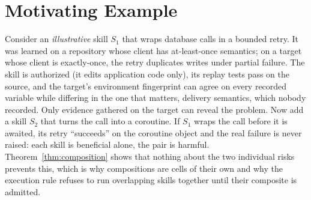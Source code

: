 \section{Motivating Example}
\label{sec:motivation}
Consider an \emph{illustrative} skill $S_1$ that wraps database calls in a bounded retry.  It was learned on a repository whose client
has at-least-once semantics; on a target whose client is exactly-once, the retry duplicates writes under partial failure.  The skill
is authorized (it edits application code only), its replay tests pass on the source, and the target's environment fingerprint can
agree on every recorded variable while differing in the one that matters, delivery semantics, which nobody recorded.  Only evidence
gathered on the target can reveal the problem.  Now add a skill $S_2$ that turns the call into a coroutine.  If $S_1$ wraps the call
before it is awaited, its retry ``succeeds'' on the coroutine object and the real failure is never raised: each skill is beneficial
alone, the pair is harmful.  Theorem~\ref{thm:composition} shows that nothing about the two individual risks prevents this, which is
why compositions are cells of their own and why the execution rule refuses to run overlapping skills together until their composite is
admitted.
